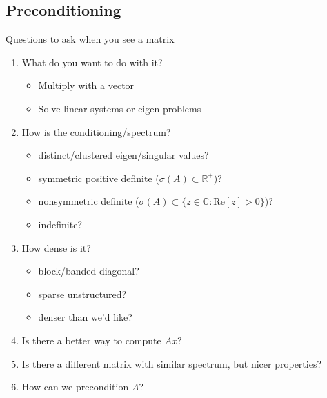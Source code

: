 \subsection{Preconditioning}



\begin{frame}{Questions to ask when you see a matrix}
  \begin{enumerate}
  \item What do you want to do with it?
    \begin{itemize}
    \item Multiply with a vector
    \item Solve linear systems or eigen-problems
    \end{itemize}
  \item How is the conditioning/spectrum?
    \begin{itemize}
    \item distinct/clustered eigen/singular values?
    \item symmetric positive definite ($\sigma(A) \subset \mathbb{R}^+$)?
    \item nonsymmetric definite ($\sigma(A) \subset \{z \in \mathbb{C} : \mathrm{Re} [z] > 0 \}$)?
    \item indefinite?
    \end{itemize}
  \item How dense is it?
    \begin{itemize}
    \item block/banded diagonal?
    \item sparse unstructured?
    \item denser than we'd like?
    \end{itemize}
  \item Is there a better way to compute $Ax$?
  \item Is there a different matrix with similar spectrum, but nicer properties?
  \item \alert<2>{How can we precondition $A$?}
  \end{enumerate}
\end{frame}

